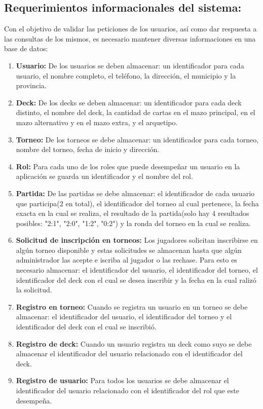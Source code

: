 \documentclass[a4paper]{article}
\begin{document}
\subsection{Requerimientos informacionales del sistema:}
Con el objetivo de validar las peticiones de los usuarios, as\'i como dar respuesta a las consultas de los mismos, es necesario mantener diversas informaciones en una base de datos:
\begin{enumerate}
	\item \textbf{Usuario:} De los usuarios se deben almacenar: un identificador para cada usuario, el nombre completo, el tel\'efono, la direcci\'on, el municipio y la provincia.
	\item \textbf{Deck:} De los decks se deben almacenar: un identificador para cada deck distinto, el nombre del deck, la cantidad de cartas en el mazo principal, en el mazo alternativo y en el mazo extra, y el arquetipo.
	\item \textbf{Torneo:} De los torneos se debe almacenar: un identificador para cada torneo, nombre del torneo, fecha de inicio y direcci\'on.
	\item \textbf{Rol:} Para cada uno de los roles que puede desempe\~nar un usuario en la aplicaci\'on se guarda un identificador y el nombre del rol.
	\item \textbf{Partida:} De las partidas se debe almacenar: el identificador de cada usuario que participa(2 en total), el identificador del torneo al cual pertenece, la fecha exacta en la cual se realiza, el resultado de la partida(solo hay 4 resultados posibles: "2:1", "2:0", "1:2", "0:2") y la ronda del torneo en la cual se realiza.
	\item \textbf{Solicitud de inscripci\'on en torneos:} Los jugadores solicitan inscribirse en alg\'un torneo disponible y estas solicitudes se almacenan hasta que alg\'un administrador las acepte e iscriba al jugador o las rechase. Para esto es necesario almacenar: el identificador del usuario, el identificador del torneo, el identificador del deck con el cual se desea inscribir y la fecha en la cual raliz\'o la solicitud. 
	\item \textbf{Registro en torneo:} Cuando se registra un usuario en un torneo se debe almacenar: el identificador del usuario, el identificador del torneo y el identificador del deck con el cual se inscribi\'o.
	\item \textbf{Registro de deck:} Cuando un usuario registra un deck como suyo se debe almacenar el identificador del usuario relacionado con el identificador del deck.
	\item \textbf{Registro de usuario:} Para todos los usuarios se debe almacenar el identificador del usuario relacionado con el identificador del rol que este desempe\~na.
\end{enumerate} 
\newpage
\end{document}
